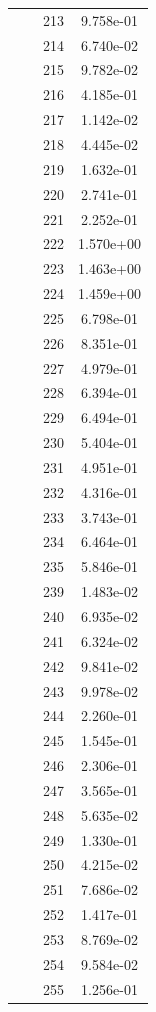 \documentclass[12pt]{article}
\begin{document}
\begin{longtable}{@{}cccc@{}}
 &  & 213 & 9.758e-01 \\
 &  & 214 & 6.740e-02 \\
 &  & 215 & 9.782e-02 \\
 &  & 216 & 4.185e-01 \\
 &  & 217 & 1.142e-02 \\
 &  & 218 & 4.445e-02 \\
 &  & 219 & 1.632e-01 \\
 &  & 220 & 2.741e-01 \\
 &  & 221 & 2.252e-01 \\
 &  & 222 & 1.570e+00 \\
 &  & 223 & 1.463e+00 \\
 &  & 224 & 1.459e+00 \\
 &  & 225 & 6.798e-01 \\
 &  & 226 & 8.351e-01 \\
 &  & 227 & 4.979e-01 \\
 &  & 228 & 6.394e-01 \\
 &  & 229 & 6.494e-01 \\
 &  & 230 & 5.404e-01 \\
 &  & 231 & 4.951e-01 \\
 &  & 232 & 4.316e-01 \\
 &  & 233 & 3.743e-01 \\
 &  & 234 & 6.464e-01 \\
 &  & 235 & 5.846e-01 \\
 &  & 239 & 1.483e-02 \\
 &  & 240 & 6.935e-02 \\
 &  & 241 & 6.324e-02 \\
 &  & 242 & 9.841e-02 \\
 &  & 243 & 9.978e-02 \\
 &  & 244 & 2.260e-01 \\
 &  & 245 & 1.545e-01 \\
 &  & 246 & 2.306e-01 \\
 &  & 247 & 3.565e-01 \\
 &  & 248 & 5.635e-02 \\
 &  & 249 & 1.330e-01 \\
 &  & 250 & 4.215e-02 \\
 &  & 251 & 7.686e-02 \\
 &  & 252 & 1.417e-01 \\
 &  & 253 & 8.769e-02 \\
 &  & 254 & 9.584e-02 \\
 &  & 255 & 1.256e-01 \\

\end{longtable}
\end{document}
